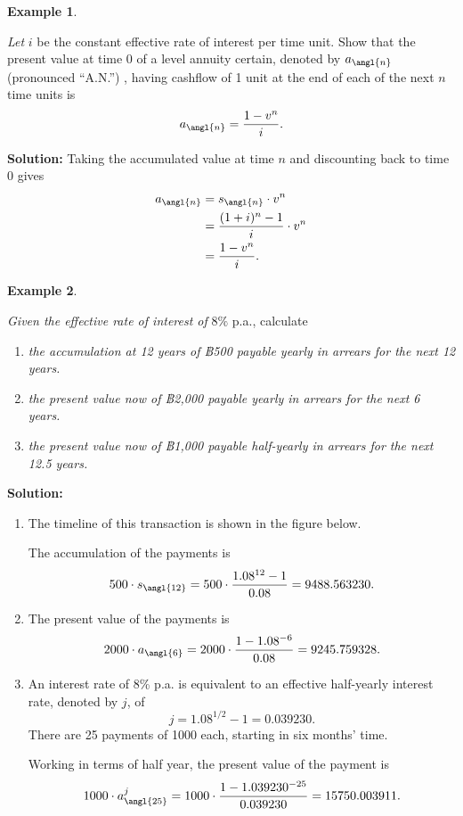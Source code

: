 \documentclass[
]{book}
\theoremstyle{definition}
\theoremstyle{definition}
\newtheorem{example}{Example}[chapter]
\theoremstyle{definition}
\theoremstyle{definition}
\theoremstyle{remark}
\begin{document}
\begin{example}
\protect\hypertarget{exm:unlabeled-div-26}{}\label{exm:unlabeled-div-26}

\emph{Let} \(i\) be the constant effective rate of interest per time unit. Show
that the present value at time 0 of a level annuity certain, denoted by
\(a_\angl{n}\) (pronounced ``A.N.'') , having cashflow of 1 unit at the end
of each of the next \(n\) time units is
\[a_\angl{n} = \frac{1 - v^n }{i}.\]

\end{example}

\textbf{Solution:} Taking the accumulated value at time \(n\) and discounting
back to time 0 gives \[\begin{aligned}
    a_\angl{n} &= s_\angl{n} \cdot v^n \\
            &= \frac{(1+i)^{n} - 1}{i} \cdot v^n \\
            &=  \frac{1 - v^n }{i}.\end{aligned}\]

\begin{example}
\protect\hypertarget{exm:unlabeled-div-27}{}\label{exm:unlabeled-div-27}

\emph{Given the effective rate of interest of} \(8\%\) p.a., calculate

\begin{enumerate}
\def\labelenumi{\arabic{enumi}.}
\item
  \emph{the accumulation at 12 years of ฿500 payable yearly in arrears for
  the next 12 years.}
\item
  \emph{the present value now of ฿2,000 payable yearly in arrears for the
  next 6 years.}
\item
  \emph{the present value now of ฿1,000 payable half-yearly in arrears for
  the next 12.5 years.}
\end{enumerate}

\end{example}

\textbf{Solution:}

\begin{enumerate}
\def\labelenumi{\arabic{enumi}.}
\item
  The timeline of this transaction is shown in the figure below.

  The accumulation of the payments is
  \[500 \cdot s_\angl{12}  = 500 \cdot \frac{1.08^{12} - 1 }{0.08 } = 9488.563230.\]
\item
  The present value of the payments is
  \[2000\cdot a_\angl{6}  = 2000 \cdot \frac{1 - 1.08^{-6} }{0.08 } = 9245.759328.\]
\item
  An interest rate of 8\% p.a. is equivalent to an effective
  half-yearly interest rate, denoted by \(j\), of
  \[j = 1.08^{1/2} -1 = 0.039230.\] There are 25 payments of 1000
  each, starting in six months' time.

  Working in terms of half year, the present value of the payment is
  \[1000 \cdot a^j_\angl{25} = 1000 \cdot \frac{1 - 1.039230^{-25} }{0.039230 } = 15750.003911.\]
\end{enumerate}
\end{document}
